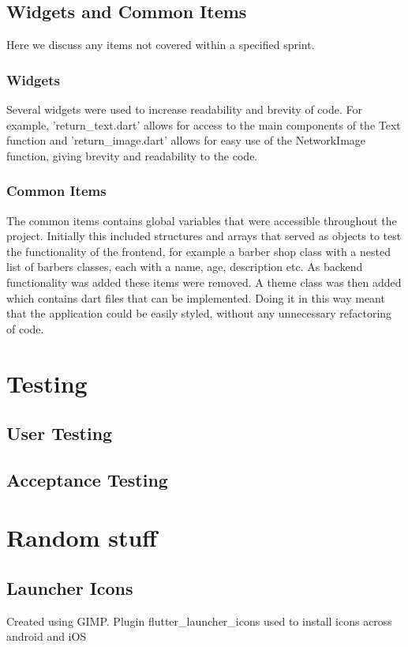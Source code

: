 \documentclass[12pt]{article}
\begin{document}
	\subsection{Widgets and Common Items}
	Here we discuss any items not covered within a specified sprint.
	
	\subsubsection{Widgets}
	Several widgets were used to increase readability and brevity of code. For example, 'return\_text.dart' allows for access to the main components of the Text function and 'return\_image.dart' allows for easy use of the NetworkImage function, giving brevity and readability to the code.
	
	\subsubsection{Common Items}
	The common items contains global variables that were accessible throughout the project. Initially this included structures and arrays that served as objects to test the functionality of the frontend, for example a barber shop class with a nested list of barbers classes, each with a name, age, description etc. As backend functionality was added these items were removed. A theme class was then added which contains dart files that can be implemented. Doing it in this way meant that the application could be easily styled, without any unnecessary refactoring of code.
	
	\section{Testing}
	\subsection{User Testing}
	\subsection{Acceptance Testing}
	\cite{Humble and Farley, 2010, chapter 8}
	
	\section{Random stuff}
	\subsection{Launcher Icons}
	Created using GIMP. Plugin flutter\_launcher\_icons used to install icons across android and iOS
	
\end{document}
